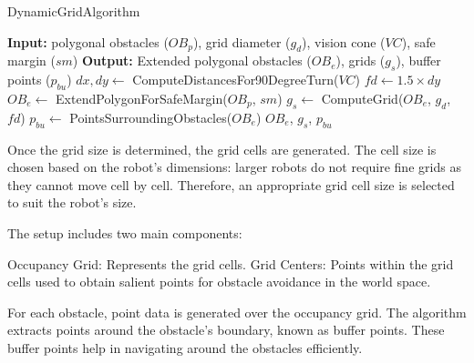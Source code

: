 \begin{algorithm}[H]
    \caption{DynamicGridAlgorithm}
    \label{alg:setup_obstacle_algorithm}
    \begin{algorithmic}[1]
    \Statex \textbf{Input:} polygonal obstacles ($OB_p$), grid diameter ($g_d$), vision cone ($VC$), safe margin ($sm$)
    \Statex \textbf{Output:} Extended polygonal obstacles ($OB_e$), grids ($g_s$), buffer points ($p_{bu}$)
    \newline
    \State $dx, dy \leftarrow$ ComputeDistancesFor90DegreeTurn($VC$)
    \State $fd \leftarrow 1.5 \times dy$
    \State $OB_e \leftarrow$ ExtendPolygonForSafeMargin($OB_p$, $sm$)
    \State $g_s \leftarrow$ ComputeGrid($OB_e$, $g_d$, $fd$)
    \State $p_{bu} \leftarrow$ PointsSurroundingObstacles($OB_e$)
    \State \Return $OB_e$, $g_s$, $p_{bu}$
    \end{algorithmic}
    \end{algorithm}

\vspace*{6mm}  


Once the grid size is determined, the grid cells are generated. The cell size is chosen based on the robot's dimensions: larger robots do not require fine grids as they cannot move cell by cell. Therefore, an appropriate grid cell size is selected to suit the robot's size.

\vspace*{6mm}  

The setup includes two main components:

\vspace*{6mm}  

Occupancy Grid: Represents the grid cells.
Grid Centers: Points within the grid cells used to obtain salient points for obstacle avoidance in the world space. 

\vspace*{6mm}  

For each obstacle, point data is generated over the occupancy grid. The algorithm extracts points around the obstacle's boundary, known as buffer points. These buffer points help in navigating around the obstacles efficiently.


\vspace*{6mm}  













